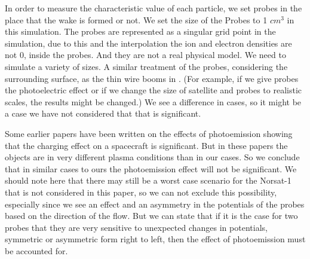 In order to measure the characteristic value of each particle, we set probes in the
place that the wake is formed or not.
We set the size of the Probes to 1 $cm^3$ in this simulation. The probes are represented as a singular
grid point in the simulation, due to this and the interpolation the ion and electron densities
are not \(0\), inside the probes. And they are not a real
physical model. We need to simulate a variety of sizes. A similar treatment of the probes, considering the surrounding surface,
as the thin wire booms in \citet{miyake_plasma_2013}.
(For example, if we give probes the photoelectric effect or if we change the size of satellite and
probes to realistic scales, the results might be changed.)
We see a difference in cases, so it might be a case we have not considered that that is significant.

Some earlier papers have been written on the effects of photoemission showing that the charging effect 
on a spacecraft is significant.\citep{ergun_spacecraft_2010} But in these papers the objects are in very different
plasma conditions than in our cases. So we conclude that in similar cases to ours the photoemission effect
will not be significant. We should note here that there may still be a worst case scenario for the Norsat-1
that is not considered in this paper, so we can not exclude this possibility, especially since we see an effect and an
asymmetry in the potentials of the probes based on the direction of the flow. But we can state that if 
it is the case for two probes that they are very sensitive to unexpected changes in potentials, symmetric or asymmetric form 
right to left, then the effect of photoemission must be accounted for.